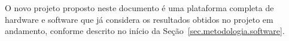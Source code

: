 \documentclass[titlepage,12pt]{article}
\begin{document}
O novo projeto proposto neste documento é uma plataforma completa de hardware e
software que já considera os resultados obtidos no projeto em andamento,
conforme descrito no início da Seção~\ref{sec.metodologia.software}.

 
\end{document}
